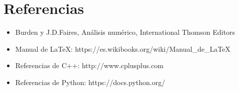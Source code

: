 \section{Referencias}

\begin{itemize}
\item Burden y J.D.Faires, Análisis numérico, International Thomson Editors
\item Manual de LaTeX: https://es.wikibooks.org/wiki/Manual_de_LaTeX
\item Referencias de C++: http://www.cplusplus.com
\item Referencias de Python: https://docs.python.org/
\end{itemize}
